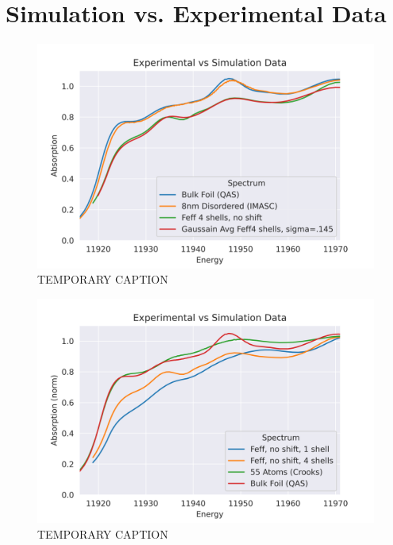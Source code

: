 \section{Simulation vs. Experimental Data}

\begin{figure}[h]
	\centering
	\includegraphics[width=.7\linewidth]{Chapters/Figures/bulk_8nm_disorder_experimental_theory_comparison.png}
	\caption[Simulation vs. Experimental]{TEMPORARY CAPTION}
	\label{fig:avg-experimental-vs-simulation}
\end{figure}


\begin{figure}[h]
	\centering
	\includegraphics[width=.7\linewidth]{Chapters/Figures/Bulk_55atom_experimental_theory_comparison.png}
	\caption[Simulation vs. Experimental 2]{TEMPORARY CAPTION}
	\label{fig:avg-experimental-vs-simulation2}
\end{figure}


